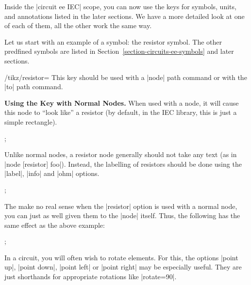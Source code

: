 Inside the |circuit ee IEC| scope, you can now use the keys for
symbols, units, and annotations listed in the later sections. We have
a more detailed look at one of each of them, all the other work the
same way.

Let us start with an example of a symbol: the resistor symbol. The
other predfined symbols are listed in
Section~\ref{section-circuits-ee-symbols} and later sections.

\begin{key}{/tikz/resistor=}
  This key should be used with a |node| path command or with the |to|
  path command.

  \medskip\textbf{Using the Key with Normal Nodes.}
  When used with a node, it will cause this node to
  ``look like'' a resistor (by default, in the IEC library, this is
  just a simple rectangle).
\begin{codeexample}[]
  \node [resistor] {};
\end{codeexample}

  Unlike normal nodes, a resistor node generally should not take any
  text (as in |node [resistor] {foo}|). Instead, the labelling of
  resistors should be done using the |label|, |info| and |ohm|
  options. 
\begin{codeexample}[]
  \node [resistor,ohm=5] {};
\end{codeexample}

  The  make no real sense when the |resistor| option is
  used with a normal node, you can just as well given them to the
  |node| itself. Thus, the following has the same effect as the above
  example:
\begin{codeexample}[]
  \node [resistor={ohm=5}] {};
\end{codeexample}

  In a circuit, you will often wish to rotate elements. For this, the
  options |point up|, |point down|, |point left| or |point right| may
  be especially useful. They are just shorthands for appropriate
  rotations like |rotate=90|.
\begin{codeexample}[]
\end{codeexample}


\end{key}
